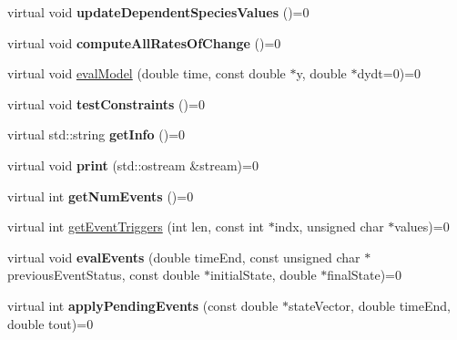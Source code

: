 \begin{DoxyCompactItemize}
\item 
\hypertarget{classrr_1_1_executable_model_a3c46304cf254796fbf3ed73a5c7f0682}{virtual void {\bfseries update\-Dependent\-Species\-Values} ()=0}\label{classrr_1_1_executable_model_a3c46304cf254796fbf3ed73a5c7f0682}

\item 
\hypertarget{classrr_1_1_executable_model_a4e53afd18d5ce83c41176ffec519092c}{virtual void {\bfseries compute\-All\-Rates\-Of\-Change} ()=0}\label{classrr_1_1_executable_model_a4e53afd18d5ce83c41176ffec519092c}

\item 
virtual void \hyperlink{classrr_1_1_executable_model_a4f35c7ea16ac6e447eacd7d4a9e1a1a4}{eval\-Model} (double time, const double $\ast$y, double $\ast$dydt=0)=0
\item 
\hypertarget{classrr_1_1_executable_model_abe4be4ec2e96aaf0a256776dff3cc9a9}{virtual void {\bfseries test\-Constraints} ()=0}\label{classrr_1_1_executable_model_abe4be4ec2e96aaf0a256776dff3cc9a9}

\item 
\hypertarget{classrr_1_1_executable_model_ab8073e0f3e57cb6f0d807bdf60d1d2a1}{virtual std\-::string {\bfseries get\-Info} ()=0}\label{classrr_1_1_executable_model_ab8073e0f3e57cb6f0d807bdf60d1d2a1}

\item 
\hypertarget{classrr_1_1_executable_model_acea87cea26a0f322a8df7b5ae73f065c}{virtual void {\bfseries print} (std\-::ostream \&stream)=0}\label{classrr_1_1_executable_model_acea87cea26a0f322a8df7b5ae73f065c}

\item 
\hypertarget{classrr_1_1_executable_model_abd94b60defc6ffa9ab17166ebaa440c5}{virtual int {\bfseries get\-Num\-Events} ()=0}\label{classrr_1_1_executable_model_abd94b60defc6ffa9ab17166ebaa440c5}

\item 
virtual int \hyperlink{classrr_1_1_executable_model_a4dfbc74b5662469e050b8df80644e31a}{get\-Event\-Triggers} (int len, const int $\ast$indx, unsigned char $\ast$values)=0
\item 
\hypertarget{classrr_1_1_executable_model_ae5c185b8ec1688ee0c318736027236c0}{virtual void {\bfseries eval\-Events} (double time\-End, const unsigned char $\ast$previous\-Event\-Status, const double $\ast$initial\-State, double $\ast$final\-State)=0}\label{classrr_1_1_executable_model_ae5c185b8ec1688ee0c318736027236c0}

\item 
\hypertarget{classrr_1_1_executable_model_aac0678d1ec9fcea3eedfb480ee5c9a3b}{virtual int {\bfseries apply\-Pending\-Events} (const double $\ast$state\-Vector, double time\-End, double tout)=0}\label{classrr_1_1_executable_model_aac0678d1ec9fcea3eedfb480ee5c9a3b}


\end{DoxyCompactItemize}
